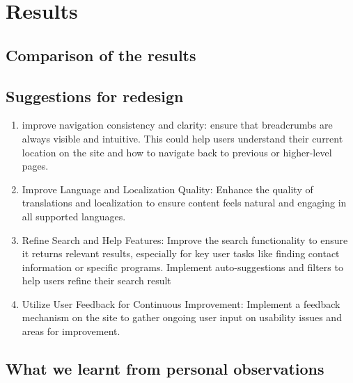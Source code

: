 \section*{Results}

\subsection{Comparison of the results}

\subsection{Suggestions for redesign}
\begin{enumerate}
	\item improve navigation consistency and clarity: ensure that breadcrumbs are always visible and intuitive. This could help users understand their current location on the site and how to navigate back to previous or higher-level pages.
	
	\item Improve Language and Localization Quality: Enhance the quality of translations and localization to ensure content feels natural and engaging in all supported languages. 
	
	\item Refine Search and Help Features: Improve the search functionality to ensure it returns relevant results, especially for key user tasks like finding contact information or specific programs. Implement auto-suggestions and filters to help users refine their search result
	
	\item Utilize User Feedback for Continuous Improvement: Implement a feedback mechanism on the site to gather ongoing user input on usability issues and areas for improvement.
\end{enumerate}

\subsection{What we learnt from personal observations}